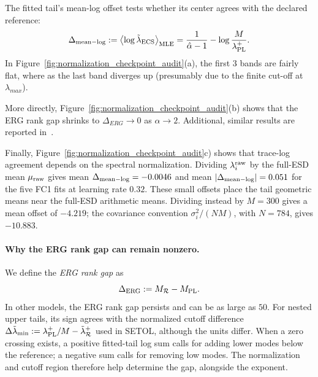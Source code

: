 The fitted tail's mean-log offset tests whether its center agrees
with the declared reference:
\begin{equation}
\Delta_{\rm mean-log}:=\left\langle\log\tilde{\lambda}_{\mathrm{ECS}}\right\rangle_{\rm MLE}
=\frac{1}{\hat\alpha-1}
-\log\frac{M}{\lambda^{+}_{\rm PL}}.
\label{eq:reconcile_normalization_mismatch}
\end{equation}
In Figure~\ref{fig:normalization_checkpoint_audit}(a), the first $3$ bands
are fairly flat, where as the last band diverges up (presumably
due to the finite cut-off at $\lambda_{max}$).

More directly, Figure~\ref{fig:normalization_checkpoint_audit}(b) shows that
the ERG rank gap shrinks to $\Delta_{ERG}\rightarrow 0$ as $\alpha \rightarrow 2$.
Additional, similar results are reported in~\cite{MartinHinrichsSETOL2025}.

Finally, Figure~\ref{fig:normalization_checkpoint_audit}c) shows that trace-log agreement depends on the spectral normalization.
Dividing $\lambda_{i}^{\rm raw}$ by the full-ESD mean $\mu_{\rm raw}$
gives mean $\Delta_{\rm mean-log}=-0.0046$ and
mean $|\Delta_{\rm mean-log}|=0.051$ for the five FC1 fits at learning rate $0.32$.
These small offsets place the tail geometric means near the full-ESD arithmetic means.
Dividing instead by $M=300$ gives a mean offset of $-4.219$; the covariance convention $\sigma_i^2/(NM)$, with $N=784$, gives $-10.883$.

\paragraph{Why the ERG rank gap can remain nonzero.}
We define the \emph{ERG rank gap} as
\begin{equation}
\Delta_{\rm ERG}:=M_{\mathcal R}-M_{\rm PL}.
\label{eq:erg_rank_gap}
\end{equation}
In other models, the ERG rank gap persists and can be as large as $50$.
For nested upper tails, its sign agrees with the normalized cutoff difference 
$\Delta\tilde{\lambda}_{\min}:=\lambda^{+}_{\rm PL}/M-\tilde{\lambda}^{+}_{\mathcal R}$ used in SETOL,
although the units differ.
When a zero crossing exists, a positive fitted-tail log sum calls for
adding lower modes below the reference; a negative sum calls for
removing low modes.  The normalization and cutoff region therefore
help determine the gap, alongside the exponent.

\ifdefined\RGDataColumnBreak\RGDataColumnBreak\fi
